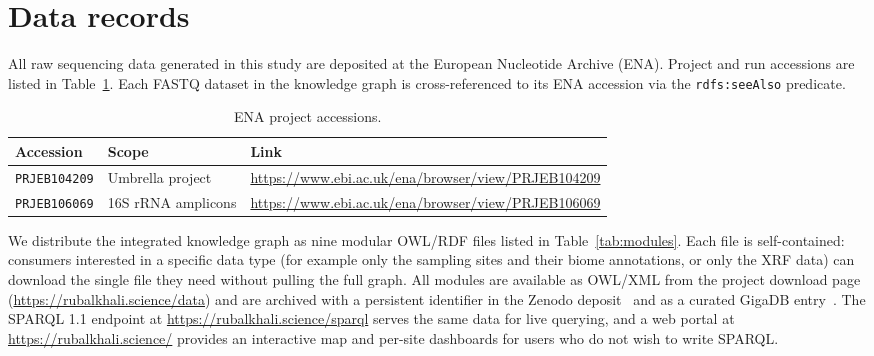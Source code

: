 \documentclass[11pt,a4paper]{article}
\begin{document}
\section{Data records}\label{records}

All raw sequencing data generated in this study are deposited at the
European Nucleotide Archive (ENA). Project and run accessions are
listed in Table~\ref{tab:ena}. Each FASTQ dataset in the knowledge
graph is cross-referenced to its ENA accession via the
\texttt{rdfs:seeAlso} predicate.

\begin{table}[h]
  \centering
  \caption{ENA project accessions.}
  \label{tab:ena}
  \begin{tabular}{lll}
    \toprule
    Accession & Scope & Link \\
    \midrule
    \texttt{PRJEB104209} & Umbrella project &
      \url{https://www.ebi.ac.uk/ena/browser/view/PRJEB104209} \\
    \texttt{PRJEB106069} & 16S rRNA amplicons &
      \url{https://www.ebi.ac.uk/ena/browser/view/PRJEB106069} \\
    \bottomrule
  \end{tabular}
\end{table}

We distribute the integrated knowledge graph as nine modular OWL/RDF
files listed in Table~\ref{tab:modules}. Each file is self-contained:
consumers interested in a specific data type (for example only the
sampling sites and their biome annotations, or only the XRF data) can
download the single file they need without pulling the full
graph. All modules are available as OWL/XML from the project download
page (\url{https://rubalkhali.science/data}) and are archived with a
persistent identifier in the Zenodo deposit~\cite{zenodo_rak} and as
a curated GigaDB entry~\cite{gigadb_rak}. The SPARQL 1.1 endpoint at
\url{https://rubalkhali.science/sparql} serves the same data for
live querying, and a web portal at \url{https://rubalkhali.science/}
provides an interactive map and per-site dashboards for users who do
not wish to write SPARQL.
\end{document}
